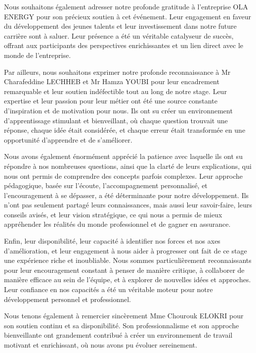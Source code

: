 \documentclass[a4paper, oneside, 12pt, final]{extreport}
\begin{document}
Nous souhaitons également adresser notre profonde gratitude à l'entreprise OLA ENERGY pour son précieux soutien à cet événement. Leur engagement en faveur du développement des jeunes talents et leur investissement dans notre future carrière sont à saluer. Leur présence a été un véritable catalyseur de succès, offrant aux participants des perspectives enrichissantes et un lien direct avec le monde de l'entreprise.

Par ailleurs, nous souhaitons exprimer notre profonde reconnaissance à Mr Charafeddine LECHHEB et Mr Hamza YOUBI pour leur encadrement remarquable et leur soutien indéfectible tout au long de notre stage. Leur expertise et leur passion pour leur métier ont été une source constante d'inspiration et de motivation pour nous. Ils ont su créer un environnement d'apprentissage stimulant et bienveillant, où chaque question trouvait une réponse, chaque idée était considérée, et chaque erreur était transformée en une opportunité d'apprendre et de s'améliorer.

Nous avons également énormément apprécié la patience avec laquelle ils ont su répondre à nos nombreuses questions, ainsi que la clarté de leurs explications, qui nous ont permis de comprendre des concepts parfois complexes. Leur approche pédagogique, basée sur l'écoute, l'accompagnement personnalisé, et l'encouragement à se dépasser, a été déterminante pour notre développement. Ils n'ont pas seulement partagé leurs connaissances, mais aussi leur savoir-faire, leurs conseils avisés, et leur vision stratégique, ce qui nous a permis de mieux appréhender les réalités du monde professionnel et de gagner en assurance.

Enfin, leur disponibilité, leur capacité à identifier nos forces et nos axes d'amélioration, et leur engagement à nous aider à progresser ont fait de ce stage une expérience riche et inoubliable. Nous sommes particulièrement reconnaissants pour leur encouragement constant à penser de manière critique, à collaborer de manière efficace au sein de l'équipe, et à explorer de nouvelles idées et approches. Leur confiance en nos capacités a été un véritable moteur pour notre développement personnel et professionnel.

Nous tenons également à remercier sincèrement Mme Chourouk ELOKRI pour son soutien continu et sa disponibilité. Son professionnalisme et son approche bienveillante ont grandement contribué à créer un environnement de travail motivant et enrichissant, où nous avons pu évoluer sereinement.
\end{document}
